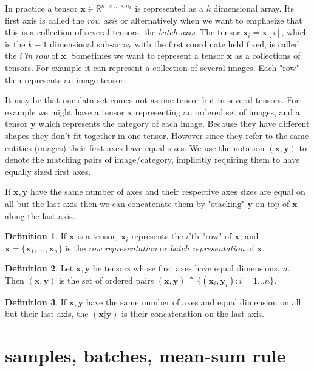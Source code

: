 \documentclass[11pt, a4paper]{report}
\theoremstyle{plain}
\theoremstyle{definition}
\newtheorem{mydef}{Definition}[chapter]
\theoremstyle{remark}
\newcommand{\R}{\mathbb{R}}
\newcommand{\x}{\mathbf{x}}
\newcommand{\y}{\mathbf{y}}
\begin{document}
In practice a tensor $\x \in \R^{n_1 \times \dots \times n_k}$ is represented as
a $k$ dimensional array. Its first axis is called the \emph{row axis} or
alternatively when we want to emphasize that this is a collection of several
tensors, the \emph{batch axis}. The tensor $\x_i = \x[i]$, which is the $k-1$
dimensional sub-array with the first coordinate held fixed, is called the
\emph{$i$'th row} of $\x$. Sometimes we want to represent a tensor $\x$ as a
collections of tensors. For example it can represent a collection of several
images. Each "row" then represents an image tensor.

It may be that our data set comes not as one tensor but in several tensors. For
example we might have a tensor $\x$ representing an ordered set of images, and a
tensor $\y$ which represents the category of each image. Because they have
different shapes they don't fit together in one tensor. However since they refer
to the same entities (images) their first axes have equal sizes. We use the
notation $(\x, \y)$ to denote the matching pairs of image/category, implicitly
requiring them to have equally sized first axes.

If $\x,\y$ have the same number of axes and their respective axes sizes are
equal on all but the last axis then we can concatenate them by "stacking" $\y$
on top of $\x$ along the last axis.

\begin{mydef}
\label{def:rowrep}
If $\x$ is a tensor, $\x_i$ represents the $i$'th "row" of $\x$,
and $\x = \{\x_1, \dots , \x_n\}$ is the \emph{row representation} or 
\emph{batch
representation} of $\x$.
\end{mydef}

\begin{mydef}
\label{def:pairnotaion}
Let $\x, \y$ be tensors whose first axes have equal dimensions, $n$. Then $(\x, \y)$
is the set of ordered pairs $(\x,\y) \triangleq \{(\x_i,\y_i) : i=1 \dots n\}$.
\end{mydef}

\begin{mydef}
\label{def:concat}
If $\x,\y$ have the same number of axes and equal dimension on all but their last axis, 
the $(\x|\y)$ is their concatenation on the last axis. 
\end{mydef}

\section{samples, batches, mean-sum rule}
\end{document}
